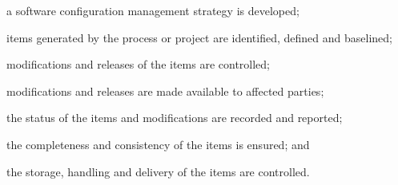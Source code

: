 			\begin{adjustwidth}{2em}{0pt} 

				\begin{compactitem}

					\item a software configuration management strategy is developed;

					\item items generated by the process or project are identified, defined and baselined;

					\item modifications and releases of the items are controlled;

					\item modifications and releases are made available to affected parties;

					\item the status of the items and modifications are recorded and reported;

					\item the completeness and consistency of the items is ensured; and

					\item the storage, handling and delivery of the items are controlled.

				\end{compactitem}

			\end{adjustwidth}

